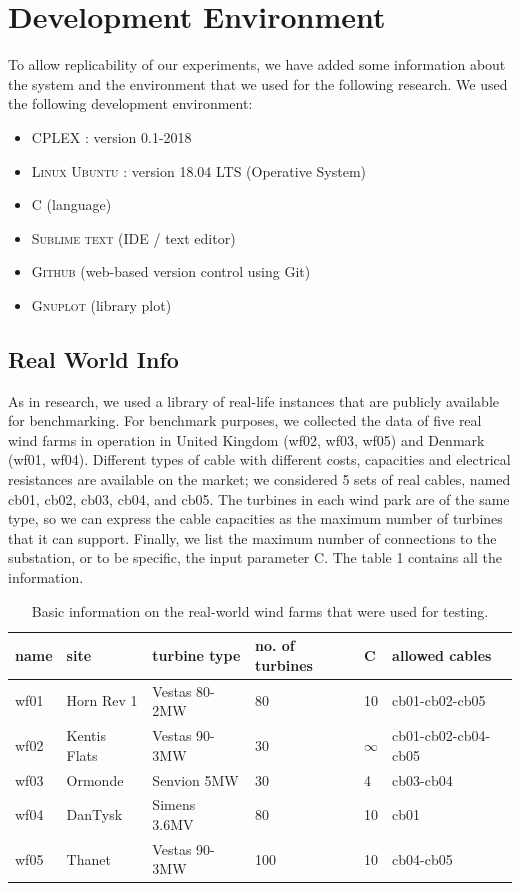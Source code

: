 
\chapter{Development Environment}
\label{chp:1-Environment}
To allow replicability of our experiments, we have added some information about the system and the environment that we used for the following research. 
We used the following development environment:
\begin{itemize}
\item \textsc{CPLEX} :  version 0.1-2018
\item \textsc{Linux Ubuntu} : version 18.04 LTS (Operative System)
\item \textsc{C}  	(language)
\item \textsc{Sublime text} (IDE / text editor)
\item \textsc{Github} (web-based version control using Git)
\item \textsc{Gnuplot} (library plot)
\end{itemize}

\section{Real World Info}
As in \cite{wfcp} research, we used a library of real-life instances that are publicly available for benchmarking.
For benchmark purposes, we collected the data of five real wind farms in operation in United Kingdom (wf02, wf03, wf05) and Denmark (wf01, wf04). Different types of cable with different costs, capacities and electrical resistances are available on the market; we considered 5 sets of real cables, named cb01, cb02, cb03, cb04, and cb05. The turbines in each wind park are of the same type, so we can express the cable capacities as the maximum number of turbines that it can support. Finally, we list the maximum number of connections to the substation, or to be specific, the input parameter C. The table 1 contains all the information.
\begin{table}[!htbp]\label{tab:realWorld}
\center
\begin{tabular}{llllll}
\hline
name & site         & turbine type  & no. of turbines & C  & allowed cables      \\ \hline
wf01 & Horn Rev 1   & Vestas 80-2MW & 80              & 10 & cb01-cb02-cb05      \\
wf02 & Kentis Flats & Vestas 90-3MW & 30              & $\infty$   & cb01-cb02-cb04-cb05 \\
wf03 & Ormonde      & Senvion 5MW   & 30              & 4  & cb03-cb04           \\
wf04 & DanTysk      & Simens 3.6MV  & 80              & 10 & cb01                \\
wf05 & Thanet       & Vestas 90-3MW & 100             & 10 & cb04-cb05           \\ \hline
\end{tabular}
\caption{Basic information on the real-world wind farms that were used for testing.}
\end{table}

